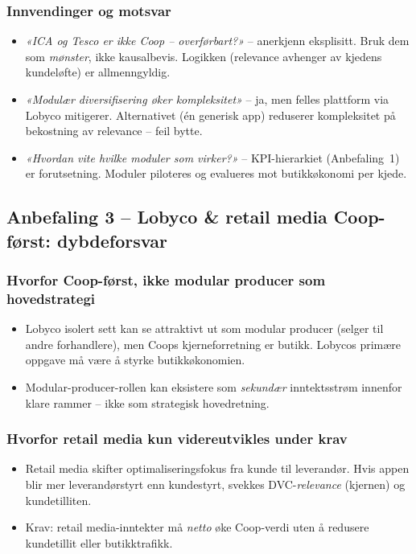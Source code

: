 \subsubsection*{Innvendinger og motsvar}
\begin{itemize}
  \item \emph{«ICA og Tesco er ikke Coop -- overførbart?»} -- anerkjenn
    eksplisitt. Bruk dem som \emph{mønster}, ikke kausalbevis. Logikken
    (relevance avhenger av kjedens kundeløfte) er allmenngyldig.
  \item \emph{«Modulær diversifisering øker kompleksitet»} -- ja, men
    felles plattform via Lobyco mitigerer. Alternativet (én generisk app)
    reduserer kompleksitet på bekostning av relevance -- feil bytte.
  \item \emph{«Hvordan vite hvilke moduler som virker?»} -- KPI-hierarkiet
    (Anbefaling~1) er forutsetning. Moduler piloteres og evalueres mot
    butikkøkonomi per kjede.
\end{itemize}

\subsection{Anbefaling 3 -- Lobyco \& retail media Coop-først: dybdeforsvar}

\subsubsection*{Hvorfor Coop-først, ikke modular producer som hovedstrategi}
\begin{itemize}
  \item Lobyco isolert sett kan se attraktivt ut som modular producer
    (selger til andre forhandlere), men Coops kjerneforretning er butikk.
    Lobycos primære oppgave må være å styrke butikkøkonomien.
  \item Modular-producer-rollen kan eksistere som \emph{sekundær}
    inntektsstrøm innenfor klare rammer -- ikke som strategisk hovedretning.
\end{itemize}

\subsubsection*{Hvorfor retail media kun videreutvikles under krav}
\begin{itemize}
  \item Retail media skifter optimaliseringsfokus fra kunde til leverandør.
    Hvis appen blir mer leverandørstyrt enn kundestyrt, svekkes
    DVC-\emph{relevance} (kjernen) og kundetilliten.
  \item Krav: retail media-inntekter må \emph{netto} øke Coop-verdi uten å
    redusere kundetillit eller butikktrafikk.
\end{itemize}

